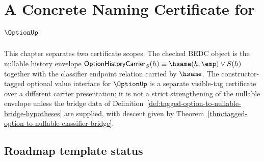 \chapter{A Concrete Naming Certificate for \(\OptionUp\)}
\label{ch:concrete-instances-option-namecert}

This chapter separates two certificate scopes. The checked BEDC object is the nullable history envelope $\mathsf{OptionHistoryCarrier}_S(h)\equiv \hsame(h,\emp)\lor S(h)$ together with the classifier endpoint relation carried by $\hsame$. The constructor-tagged optional value interface for $\OptionUp$ is a separate visible-tag certificate over a different carrier presentation; it is not a strict strengthening of the nullable envelope unless the bridge data of Definition~\ref{def:tagged-option-to-nullable-bridge-hypotheses} are supplied, with descent given by Theorem~\ref{thm:tagged-option-to-nullable-classifier-bridge}.

\section{Roadmap template status}

